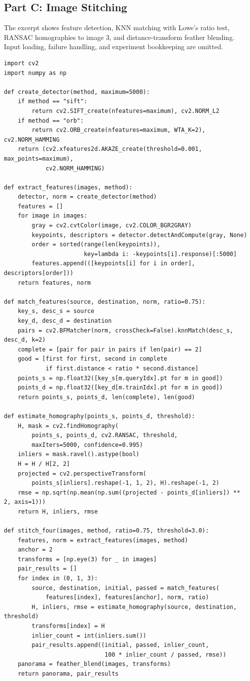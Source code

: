 \documentclass[a4paper,12pt]{article}
\begin{document}
\subsection{Part C: Image Stitching}
The excerpt shows feature detection, KNN matching with Lowe's ratio test, RANSAC homographies to image 3, and distance-transform feather blending. Input loading, failure handling, and experiment bookkeeping are omitted.
\begin{lstlisting}
import cv2
import numpy as np

def create_detector(method, maximum=5000):
    if method == "sift":
        return cv2.SIFT_create(nfeatures=maximum), cv2.NORM_L2
    if method == "orb":
        return cv2.ORB_create(nfeatures=maximum, WTA_K=2), cv2.NORM_HAMMING
    return (cv2.xfeatures2d.AKAZE_create(threshold=0.001, max_points=maximum),
            cv2.NORM_HAMMING)

def extract_features(images, method):
    detector, norm = create_detector(method)
    features = []
    for image in images:
        gray = cv2.cvtColor(image, cv2.COLOR_BGR2GRAY)
        keypoints, descriptors = detector.detectAndCompute(gray, None)
        order = sorted(range(len(keypoints)),
                       key=lambda i: -keypoints[i].response)[:5000]
        features.append(([keypoints[i] for i in order], descriptors[order]))
    return features, norm

def match_features(source, destination, norm, ratio=0.75):
    key_s, desc_s = source
    key_d, desc_d = destination
    pairs = cv2.BFMatcher(norm, crossCheck=False).knnMatch(desc_s, desc_d, k=2)
    complete = [pair for pair in pairs if len(pair) == 2]
    good = [first for first, second in complete
            if first.distance < ratio * second.distance]
    points_s = np.float32([key_s[m.queryIdx].pt for m in good])
    points_d = np.float32([key_d[m.trainIdx].pt for m in good])
    return points_s, points_d, len(complete), len(good)

def estimate_homography(points_s, points_d, threshold):
    H, mask = cv2.findHomography(
        points_s, points_d, cv2.RANSAC, threshold,
        maxIters=5000, confidence=0.995)
    inliers = mask.ravel().astype(bool)
    H = H / H[2, 2]
    projected = cv2.perspectiveTransform(
        points_s[inliers].reshape(-1, 1, 2), H).reshape(-1, 2)
    rmse = np.sqrt(np.mean(np.sum((projected - points_d[inliers]) ** 2, axis=1)))
    return H, inliers, rmse

def stitch_four(images, method, ratio=0.75, threshold=3.0):
    features, norm = extract_features(images, method)
    anchor = 2
    transforms = [np.eye(3) for _ in images]
    pair_results = []
    for index in (0, 1, 3):
        source, destination, initial, passed = match_features(
            features[index], features[anchor], norm, ratio)
        H, inliers, rmse = estimate_homography(source, destination, threshold)
        transforms[index] = H
        inlier_count = int(inliers.sum())
        pair_results.append((initial, passed, inlier_count,
                             100 * inlier_count / passed, rmse))
    panorama = feather_blend(images, transforms)
    return panorama, pair_results


\end{lstlisting}
\end{document}
